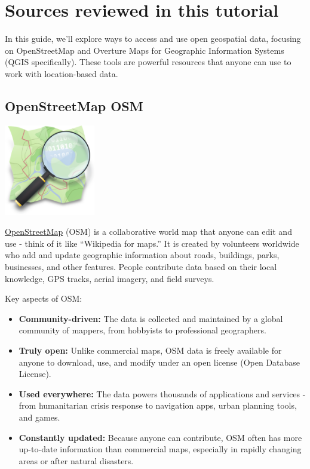 \documentclass[
  letterpaper,
  DIV=11,
  numbers=noendperiod]{scrartcl}
\begin{document}
\section{Sources reviewed in this
tutorial}\label{sources-reviewed-in-this-tutorial}

In this guide, we'll explore ways to access and use open geospatial
data, focusing on OpenStreetMap and Overture Maps for Geographic
Information Systems (QGIS specifically). These tools are powerful
resources that anyone can use to work with location-based data.

\subsection{OpenStreetMap OSM}\label{openstreetmap-osm}

\includegraphics[width=1.5625in,height=\textheight,keepaspectratio]{./images/osmlogo.png}

\href{openstreemap.org}{OpenStreetMap} (OSM) is a collaborative world
map that anyone can edit and use - think of it like ``Wikipedia for
maps.'' It is created by volunteers worldwide who add and update
geographic information about roads, buildings, parks, businesses, and
other features. People contribute data based on their local knowledge,
GPS tracks, aerial imagery, and field surveys.

Key aspects of OSM:

\begin{itemize}
\item
  \textbf{Community-driven:} The data is collected and maintained by a
  global community of mappers, from hobbyists to professional
  geographers.
\item
  \textbf{Truly open:} Unlike commercial maps, OSM data is freely
  available for anyone to download, use, and modify under an open
  license (Open Database License).
\item
  \textbf{Used everywhere:} The data powers thousands of applications
  and services - from humanitarian crisis response to navigation apps,
  urban planning tools, and games.
\item
  \textbf{Constantly updated:} Because anyone can contribute, OSM often
  has more up-to-date information than commercial maps, especially in
  rapidly changing areas or after natural disasters.
\end{itemize}
\end{document}
